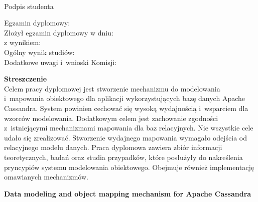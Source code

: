 \vspace{0.5cm}

\begin{flushright}
  \begin{minipage}{5cm}
   \dotfill \\[-0.7cm]
   \begin{center}
   \small Podpis studenta
   \end{center}
  \end{minipage}
 \end{flushright}

\vspace{0.5cm}
 
 \begin{flushleft}
  Egzamin dyplomowy: \\
  Złożył egzamin dyplomowy w dniu: \dotfill \\
  z wynikiem: \dotfill \\
  Ogólny wynik studiów: \dotfill \\
  Dodatkowe uwagi i~wnioski Komisji: \dotfill \\
  \hspace{0cm} \dotfill
\end{flushleft}
 
  
\newpage
\thispagestyle{empty}
 
\textbf{Streszczenie} \\
 
  Celem pracy dyplomowej jest stworzenie mechanizmu do modelowania i~mapowania obiektowego dla aplikacji wykorzystujących bazę danych Apache Cassandra. System powinien cechować się wysoką wydajnością i~wsparciem dla wzorców modelowania. Dodatkowym celem jest zachowanie zgodności z~istniejącymi mechanizmami mapowania dla baz relacyjnych. Nie wszystkie cele udało się zrealizować. Stworzenie wydajnego mapowania wymagało odejścia od relacyjnego modelu danych. Praca dyplomowa zawiera zbiór informacji teoretycznych, badań oraz studia przypadków, które posłużyły do nakreślenia pryncypiów systemu modelowania obiektowego. Obejmuje również implementację omawianych mechanizmów.
 
 
 \begin{center}
  \large \textbf{Data modeling and object mapping mechanism for Apache Cassandra}
 \end{center}

 \vspace*{1cm}
 
